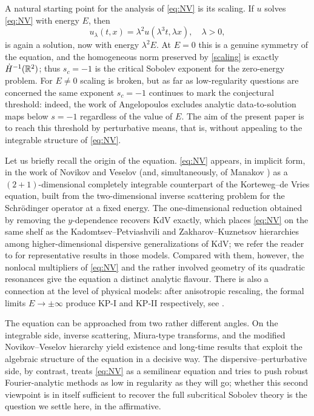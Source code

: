 \medskip

A natural starting point for the analysis of \eqref{eq:NV} is its scaling. If $u$ solves \eqref{eq:NV} with energy $E$, then
\begin{equation}\label{scaling}
u_\lambda(t,x)=\lambda^2u(\lambda^3t,\lambda x),\quad \lambda>0,
\end{equation}
is again a solution, now with energy $\lambda^2E$. At $E=0$ this is a genuine symmetry of the equation, and the homogeneous norm preserved by \eqref{scaling} is exactly $\dot H^{-1}(\mathbb{R}^2)$; thus $s_c=-1$ is the critical Sobolev exponent for the zero-energy problem. For $E\neq 0$ scaling is broken, but as far as low-regularity questions are concerned the same exponent $s_c=-1$ continues to mark the conjectural threshold: indeed, the work of Angelopoulos \cite{angelopolous} excludes analytic data-to-solution maps below $s=-1$ regardless of the value of $E$. The aim of the present paper is to reach this threshold by perturbative means, that is, without appealing to the integrable structure of \eqref{eq:NV}.

\medskip

Let us briefly recall the origin of the equation. \eqref{eq:NV} appears, in implicit form, in the work of Novikov and Veselov \cite{NovikovVeselov} (and, simultaneously, of Manakov \cite{Manakov}) as a $(2+1)$-dimensional completely integrable counterpart of the Korteweg--de Vries equation, built from the two-dimensional inverse scattering problem for the Schr\"odinger operator at a fixed energy. The one-dimensional reduction obtained by removing the $y$-dependence recovers KdV exactly, which places \eqref{eq:NV} on the same shelf as the Kadomtsev--Petviashvili and Zakharov--Kuznetsov hierarchies among higher-dimensional dispersive generalizations of KdV; we refer the reader to \cite{bourg_kpii, takaokaTzvetkov, HHK, IonescuKenigTataru, GuoPengWang, Kinoshita_ZK} for representative results in those models. Compared with them, however, the nonlocal multipliers of \eqref{eq:NV} and the rather involved geometry of its quadratic resonances give the equation a distinct analytic flavour. There is also a connection at the level of physical models: after anisotropic rescaling, the formal limits $E\to\pm\infty$ produce KP-I and KP-II respectively, see \cite{kazeykinamunoz1, kazeykinamunoz2}.

\medskip

The equation can be approached from two rather different angles. On the integrable side, inverse scattering, Miura-type transforms, and the modified Novikov--Veselov hierarchy yield existence and long-time results that exploit the algebraic structure of the equation in a decisive way. The dispersive--perturbative side, by contrast, treats \eqref{eq:NV} as a semilinear equation and tries to push robust Fourier-analytic methods as low in regularity as they will go; whether this second viewpoint is in itself sufficient to recover the full subcritical Sobolev theory is the question we settle here, in the affirmative.

